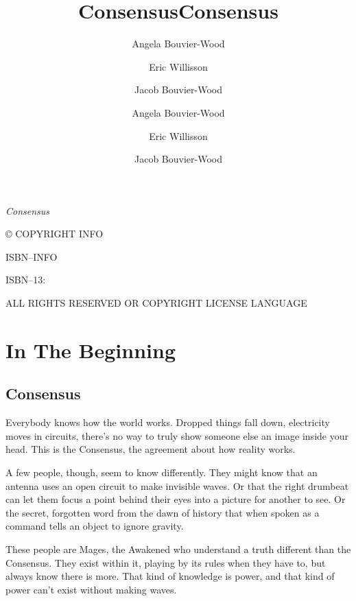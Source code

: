 \documentclass[
]{memoir}
\title{Consensus}
\author{Angela Bouvier-Wood \and Eric Willisson \and Jacob Bouvier-Wood}
\date{} %
\author{Angela Bouvier-Wood \and Eric Willisson \and Jacob Bouvier-Wood}
\title{Consensus}
\date{}
\makeatletter
\def\maketitle{%
  \null
  \thispagestyle{empty}%
  \vfill
  \begin{center}\leavevmode
    \normalfont
    {\LARGE\raggedleft \@author\par}%
    \hrulefill\par
    {\huge\raggedright \@title\par}%
    \vskip 1cm
  \end{center}%
  \vfill
  \null
  \cleardoublepage
  }
\makeatother
\begin{document}
\let\cleardoublepage\clearpage


\maketitle






\frontmatter

\null\vfill

\begin{flushleft}
\textit{Consensus}


© COPYRIGHT INFO


ISBN--INFO

ISBN--13: 
\bigskip





ALL RIGHTS RESERVED OR COPYRIGHT LICENSE LANGUAGE




\end{flushleft}
\let\cleardoublepage\clearpage

\mainmatter

{
\tableofcontents
}

\hypertarget{in-the-beginning}{%
\chapter{In The Beginning}\label{in-the-beginning}}

\hypertarget{consensus}{%
\section{Consensus}\label{consensus}}

Everybody knows how the world works. Dropped things fall down,
electricity moves in circuits, there's no way to truly show someone else
an image inside your head. This is the Consensus, the agreement about
how reality works.

A few people, though, seem to know differently. They might know that an
antenna uses an open circuit to make invisible waves. Or that the right
drumbeat can let them focus a point behind their eyes into a picture for
another to see. Or the secret, forgotten word from the dawn of history
that when spoken as a command tells an object to ignore gravity.

These people are Mages, the Awakened who understand a truth different
than the Consensus. They exist within it, playing by its rules when they
have to, but always know there is more. That kind of knowledge is power,
and that kind of power can't exist without making waves.
\end{document}
